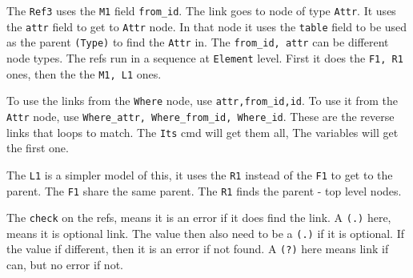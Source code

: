 \documentclass[11pt]{article}
\begin{document}
The \texttt{Ref3} uses the \texttt{M1} field \texttt{from\_id}. The link
goes to node of type \texttt{Attr}. It uses the \texttt{attr} field to
get to \texttt{Attr} node. In that node it uses the \texttt{table} field
to be used as the parent \texttt{(Type)} to find the \texttt{Attr} in.
The \texttt{from\_id,\ attr} can be different node types. The refs run
in a sequence at \texttt{Element} level. First it does the
\texttt{F1,\ R1} ones, then the the \texttt{M1,\ L1} ones.

To use the links from the \texttt{Where} node, use
\texttt{attr,from\_id,id}. To use it from the \texttt{Attr} node, use
\texttt{Where\_attr,\ Where\_from\_id,\ Where\_id}. These are the
reverse links that loops to match. The \texttt{Its} cmd will get them
all, The variables will get the first one.

The \texttt{L1} is a simpler model of this, it uses the \texttt{R1}
instead of the \texttt{F1} to get to the parent. The \texttt{F1} share
the same parent. The \texttt{R1} finds the parent - top level nodes.

The \texttt{check} on the refs, means it is an error if it does find the
link. A \texttt{(.)} here, means it is optional link. The value then
also need to be a \texttt{(.)} if it is optional. If the value if
different, then it is an error if not found. A \texttt{(?)} here means
link if can, but no error if not.
\end{document}
